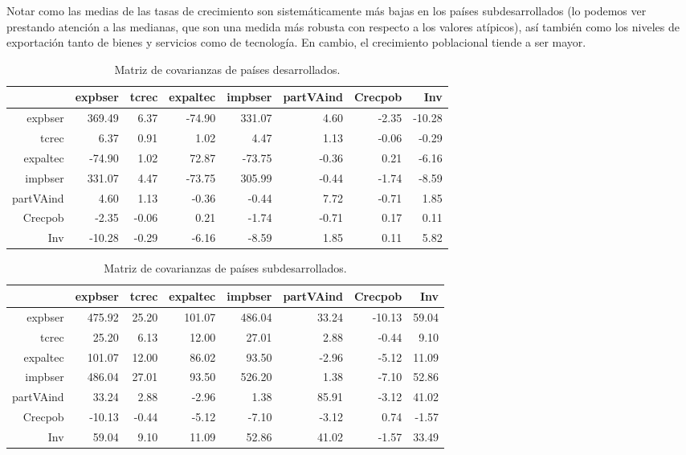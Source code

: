 \documentclass[a4paper,10pt]{article}
\begin{document}
Notar como las medias de las tasas de crecimiento son sistemáticamente más bajas en los países subdesarrollados
(lo podemos ver prestando atención a las medianas, que son una medida más robusta con respecto a los valores atípicos), así también como los niveles de exportación
tanto de bienes y servicios como de tecnología. En cambio, el crecimiento poblacional tiende a ser mayor. 

\begin{table}[ht]
\centering
\begin{tabular}{rrrrrrrr}
  \hline
 & expbser & tcrec & expaltec & impbser & partVAind & Crecpob & Inv \\ 
  \hline
expbser & 369.49 & 6.37 & -74.90 & 331.07 & 4.60 & -2.35 & -10.28 \\ 
  tcrec & 6.37 & 0.91 & 1.02 & 4.47 & 1.13 & -0.06 & -0.29 \\ 
  expaltec & -74.90 & 1.02 & 72.87 & -73.75 & -0.36 & 0.21 & -6.16 \\ 
  impbser & 331.07 & 4.47 & -73.75 & 305.99 & -0.44 & -1.74 & -8.59 \\ 
  partVAind & 4.60 & 1.13 & -0.36 & -0.44 & 7.72 & -0.71 & 1.85 \\ 
  Crecpob & -2.35 & -0.06 & 0.21 & -1.74 & -0.71 & 0.17 & 0.11 \\ 
  Inv & -10.28 & -0.29 & -6.16 & -8.59 & 1.85 & 0.11 & 5.82 \\ 
   \hline
\end{tabular}
\caption{Matriz de covarianzas de países desarrollados.}
\end{table}

\begin{table}[ht]
\centering
\begin{tabular}{rrrrrrrr}
  \hline
 & expbser & tcrec & expaltec & impbser & partVAind & Crecpob & Inv \\ 
  \hline
expbser & 475.92 & 25.20 & 101.07 & 486.04 & 33.24 & -10.13 & 59.04 \\ 
  tcrec & 25.20 & 6.13 & 12.00 & 27.01 & 2.88 & -0.44 & 9.10 \\ 
  expaltec & 101.07 & 12.00 & 86.02 & 93.50 & -2.96 & -5.12 & 11.09 \\ 
  impbser & 486.04 & 27.01 & 93.50 & 526.20 & 1.38 & -7.10 & 52.86 \\ 
  partVAind & 33.24 & 2.88 & -2.96 & 1.38 & 85.91 & -3.12 & 41.02 \\ 
  Crecpob & -10.13 & -0.44 & -5.12 & -7.10 & -3.12 & 0.74 & -1.57 \\ 
  Inv & 59.04 & 9.10 & 11.09 & 52.86 & 41.02 & -1.57 & 33.49 \\ 
   \hline
\end{tabular}
\caption{Matriz de covarianzas de países subdesarrollados.}
\end{table}
\end{document}
